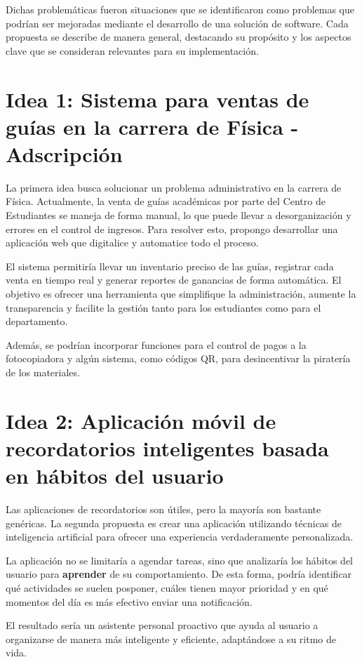 \documentclass[12pt]{article}
\begin{document}
Dichas problemáticas fueron situaciones que se identificaron como problemas que podrían ser mejoradas mediante el desarrollo de una solución de software. Cada propuesta se describe de manera general, destacando su propósito y los aspectos clave que se consideran relevantes para su implementación.

\section*{Idea 1: Sistema para ventas de guías en la carrera de Física - Adscripción}

La primera idea busca solucionar un problema administrativo en la carrera de Física.
Actualmente, la venta de guías académicas por parte del Centro de Estudiantes se maneja de forma manual, lo que puede llevar a desorganización y errores en el control de ingresos. Para resolver esto, propongo desarrollar una aplicación web que digitalice y automatice todo el proceso.

El sistema permitiría llevar un inventario preciso de las guías, registrar cada venta en tiempo real y generar reportes de ganancias de forma automática. El objetivo es ofrecer una herramienta que simplifique la administración, aumente la transparencia y facilite la gestión tanto para los estudiantes como para el departamento.

Además, se podrían incorporar funciones para el control de pagos a la fotocopiadora y algún sistema, como códigos QR, para desincentivar la piratería de los materiales.

\section*{Idea 2: Aplicación móvil de recordatorios inteligentes basada en hábitos del usuario}

Las aplicaciones de recordatorios son útiles, pero la mayoría son bastante genéricas.
La segunda propuesta es crear una aplicación utilizando técnicas de inteligencia artificial para ofrecer una experiencia verdaderamente personalizada.

La aplicación no se limitaría a agendar tareas, sino que analizaría los hábitos del usuario para \textbf{aprender} de su comportamiento. De esta forma, podría identificar qué actividades se suelen posponer, cuáles tienen mayor prioridad y en qué momentos del día es más efectivo enviar una notificación.

El resultado sería un asistente personal proactivo que ayuda al usuario a organizarse de manera más inteligente y eficiente, adaptándose a su ritmo de vida.
\end{document}
